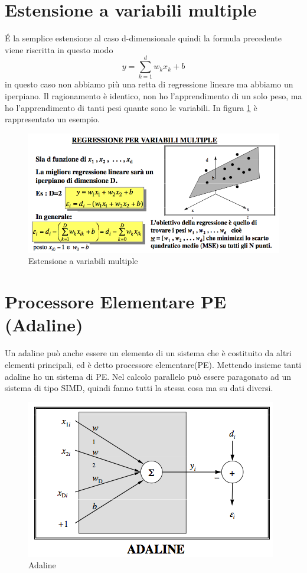 \section{Estensione a variabili multiple}
\'E la semplice estensione al caso d-dimensionale quindi la formula precedente viene riscritta in questo modo
\begin{equation}
y= \sum_{k=1}^d w_k x_k + b
\end{equation}
in questo caso non abbiamo più una retta di regressione lineare ma abbiamo un iperpiano. Il ragionamento è identico, non ho l'apprendimento di un solo peso, ma ho l'apprendimento di tanti pesi quante sono le variabili. In figura \ref{ndim} è rappresentato un esempio.
\begin{figure}
\centering
\includegraphics[scale=0.6]{img/caso_ndim.png}
\caption{Estensione a variabili multiple}
\label{ndim}
\end{figure}

\section{Processore Elementare PE (Adaline)}
Un adaline può anche essere un elemento di un sistema che è costituito da altri elementi principali, ed è detto processore elementare(PE). Mettendo insieme tanti adaline ho un sistema di PE. Nel calcolo parallelo può essere paragonato ad un sistema di tipo SIMD, quindi fanno tutti la stessa cosa ma su dati diversi. 
\begin{figure}
\centering
\includegraphics[scale=0.7]{img/adaline2.png}
\caption{Adaline}
\label{adaline2}
\end{figure}



%

